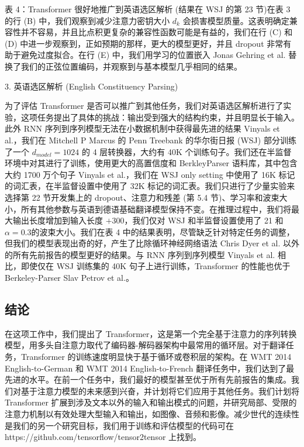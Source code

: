 表 4：Transformer 很好地推广到英语选区解析 (结果在 WSJ 的第 23 节)在表 3 的行 (B) 中，我们观察到减少注意力密钥大小 $d_{k}$ 会损害模型质量。这表明确定兼容性并不容易，并且比点积更复杂的兼容性函数可能是有益的，我们在行 (C) 和 (D) 中进一步观察到，正如预期的那样，更大的模型更好，并且 dropout 非常有助于避免过度拟合。在行 (E) 中，我们用学习的位置嵌入 Jonas Gehring et al. 替换了我们的正弦位置编码，并观察到与基本模型几乎相同的结果。

3. 英语选区解析 (English Constituency Parsing)

为了评估 Transformer 是否可以推广到其他任务，我们对英语选区解析进行了实验，这项任务提出了具体的挑战：输出受到强大的结构约束，并且明显长于输入。此外 RNN 序列到序列模型无法在小数据机制中获得最先进的结果 Vinyals et al.，我们在 Mitchell P Marcus 的 Penn Treebank 的华尔街日报 (WSJ) 部分训练了一个 $d_{model} = 1024$ 的 4 层转换器，大约有 40K 个训练句子。我们还在半监督环境中对其进行了训练，使用更大的高置信度和 BerkleyParser 语料库，其中包含大约 1700 万个句子 Vinyals et al.，我们在 WSJ only setting 中使用了 16K 标记的词汇表，在半监督设置中使用了 32K 标记的词汇表。我们只进行了少量实验来选择第 22 节开发集上的 dropout、注意力和残差 (第 5.4 节)、学习率和波束大小，所有其他参数与英语到德语基础翻译模型保持不变。在推理过程中，我们将最大输出长度增加到输入长度 $+ 300$，我们仅对 WSJ 和半监督设置使用了 21 和 $\alpha=0.3$的波束大小。我们在表 4 中的结果表明，尽管缺乏针对特定任务的调整，但我们的模型表现出奇的好，产生了比除循环神经网络语法 Chris Dyer et al. 以外的所有先前报告的模型更好的结果。与 RNN 序列到序列模型 Vinyals et al. 相比，即使仅在 WSJ 训练集的 40K 句子上进行训练，Transformer 的性能也优于 Berkeley-Parser Slav Petrov et al.。

\subsection{结论}

在这项工作中，我们提出了 Transformer，这是第一个完全基于注意力的序列转换模型，用多头自注意力取代了编码器-解码器架构中最常用的循环层。对于翻译任务，Transformer 的训练速度明显快于基于循环或卷积层的架构。在 WMT 2014 English-to-German 和 WMT 2014 English-to-French 翻译任务中，我们达到了最先进的水平。在前一个任务中，我们最好的模型甚至优于所有先前报告的集成。我们对基于注意力模型的未来感到兴奋，并计划将它们应用于其他任务。我们计划将 Transformer 扩展到涉及文本以外的输入和输出模式的问题，并研究局部、受限的注意力机制以有效处理大型输入和输出，如图像、音频和影像。减少世代的连续性是我们的另一个研究目标，我们用于训练和评估模型的代码可在 https://github.com/tensorflow/tensor2tensor 上找到。


